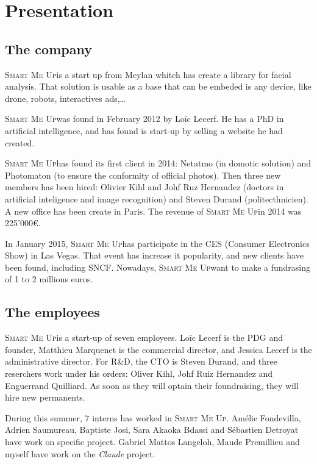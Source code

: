 \documentclass[a4paper,11pt]{custom}
\newcommand{\smu}{\textsc{Smart Me Up}}
\newcommand{\claude}{\textit{Claude}}
\begin{document}
\chapter{Presentation}

\section{The company}

\smu is a start up from Meylan whitch has create a library for facial
analysis. That solution is usable as a base that can be embeded is any device,
like drone, robots, interactives ads,…

\smu was found in February 2012 by Loïc Lecerf. He has a PhD in artificial
intelligence, and has found is start-up by selling a website he had created.

\smu has found its first client in 2014: Netatmo (in domotic solution) and
Photomaton (to ensure the conformity of official photos). Then three new members
has been hired: Olivier Kihl and Johf Ruz Hernandez (doctors in artificial
inteligence and image recognition) and Steven Durand (politecthnicien). A new
office has been create in Paris. The revenue of \smu in 2014 was 225'000\euro.

In January 2015, \smu has participate in the CES (Consumer Electronics Show) in
Las Vegas. That event has increase it popularity, and new clients have been
found, including SNCF. Nowadays, \smu want to make a fundrasing of 1 to 2
millions euros.

\section{The employees}

\smu is a start-up of seven employees. Loïc Lecerf is the PDG and founder,
Matthieu Marquenet is the commercial director, and Jessica Lecerf is the
administrative director. For R\&D, the CTO is Steven Durand, and three
reserchers work under his orders: Oliver Kihl, Johf Ruiz Hernandez and
Enguerrand Quilliard. As soon as they will optain their foundraising, they will
hire new permanents.

During this summer, 7 interns has worked in \smu. Amélie Fondevilla, Adrien
Saumureau, Baptiste Josi, Sara Akaoka Bdassi and Sébastien Detroyat have work on
specific project. Gabriel Mattos Langeloh, Maude Premillieu and myself have work
on the \claude{} project.
\end{document}

